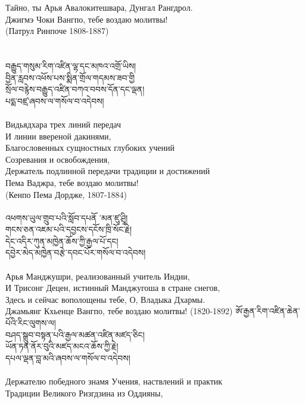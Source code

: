 Тайно, ты Арья Авалокитешвара, Дунгал Рангдрол.\\
Джигмэ Чоки Вангпо, тебе воздаю молитвы!\\
\hspace{1cm} (Патрул Ринпоче 1808-1887)\\
\\
\\
\ti
བརྒྱུད་གསུམ་རིག་འཛིན་ལྷ་དང་མཁའ་འགྲོ་ཡིས། \\
བྱིན་རླབས་འཕོས་པས་སྨིན་གྲོལ་གདམས་ཟབ་གྱི \\
སྲོལ་བརྙེས་བརྒྱུད་འཛིན་བཀའ་བབས་དོན་དང་ལྡན། \\
པདྨ་བཛྲ་ཞབས་ལ་གསོལ་བ་འདེབས།\\
\\
\ru
Видьядхара трех линий передач\\ И линии ввереной дакинями,\\
Благословенных сущностных глубоких учений \\Созревания и освобождения,\\
Держатель подлинной передачи традиции и достижений\\
Пема Ваджра, тебе воздаю молитвы! \\
\hspace{1cm} (Кенпо Пема Дордже, 1807-1884)\\
\\
\ti
འཕགས་ཡུལ་གྲུབ་པའི་སློབ་དཔནོ ་མན་ཛུ་ཤྲཱི། \\
གངས་ཅན་འཇམ་པའི་དབྱངས་དངོས་ཁྲི་སོང་རྗེ། \\
དེང་འདིར་ཀུན་མཁྱེན་ཆོས་ཀྱི་རྒྱལ་པོ་དང། \\
དབྱེར་མེད་མཁྱེན་བརྩེ་དབང་པོར་གསོལ་བ་འདེབས།\\
\\
\ru
Арья Манджушри, реализованный учитель Индии,\\
И Трисонг Децен, истинный Манджугоша в стране снегов,\\
Здесь и сейчас вополощены тебе, О, Владыка Дхармы. \\
Джамьянг Кхьенце Вангпо, тебе воздаю молитвы! (1820-1892)
\newpage
\ti
ཨོ་རྒྱན་རིག་འཛིན་ཆེན་པོའི་རིང་ལུགས་ལ། \\
བཤད་སྒྲུབ་བསྟན་པའི་རྒྱལ་མཚན་འཛིན་མཛད་ཅིང།\\
 ཡོན་ཏན་ནོར་བུའི་མཛད་མངའ་ཆོས་ཀྱི་རྗེ། \\
དཔལ་ལྡན་བླ་མའི་ཞབས་ལ་གསོལ་བ་འདེབས།\\
\\
\ru
Держателю победного знамя Учения, наствлений и практик\\
Традиции Великого Ризгдзина из Оддияны,\\
